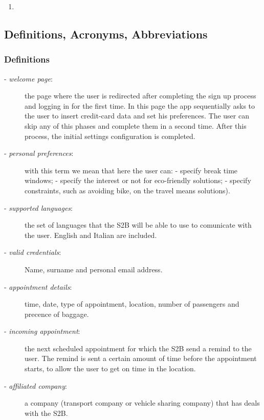 \begin{enumerate}[label={[G\arabic*]}]
		\item {}
		\item {}
		\item {}
		\begin{enumerate}[label=\theenumi\#{\arabic*}]
			\item {}
		\end{enumerate}
	\end{enumerate}

\subsection{Definitions, Acronyms, Abbreviations}
	\subsubsection{Definitions}
		\begin{description}
			\item[- \textit{welcome page}:] the page where the user is redirected after completing the sign up process and logging in for the first time. In this page the app sequentially  asks to the user to insert credit-card data and set his preferences. The user can skip any of this phases and complete them in a second time. After this process, the initial settings configuration is completed.
			\item[- \textit{personal preferences}:] with this term we mean that here the user can:\newline
			- specify break time windows; \newline
			- specify the interest or not for eco-friendly solutions;\newline
			- specify constraints, such as avoiding  bike, on the travel means solutions).
			\item[- \textit{supported languages}:] the set of languages that the S2B will be able to use to comunicate with the user. English and Italian are included.
			\item[- \textit{valid credentials}:] Name, surname and personal email address.
			\item[- \textit{appointment details}:] time, date, type of appointment, location, number of passengers and precence of baggage.
			\item[- \textit{incoming appointment}:] the next scheduled appointment for which the S2B send a remind to the user. The remind is sent  a certain amount of time before the appointment starts, to allow the user to get on time in the location.
			\item[- \textit{affiliated company}:] a company (transport company or vehicle sharing company) that has deals with the S2B.
		\end{description}
